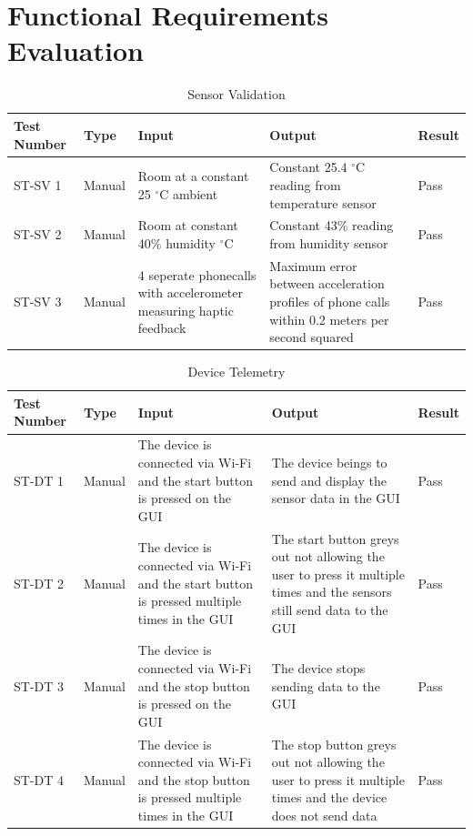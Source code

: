 \documentclass[12pt, titlepage]{article}
\begin{document}
\section{Functional Requirements Evaluation}
\begin{table}[!htbp]
  \begin{tabular}{| p{} | p{}| p{}| p{}| p{}|}
    \hline
    \rowcolor[gray]{0.9}
    Test Number & Type & Input & Output & Result\\
    \hline
    ST-SV 1 & Manual & Room at a constant 25 $^{\circ}$C ambient & Constant 25.4 $^{\circ}$C reading from temperature sensor & Pass \\
    \hline
    ST-SV 2 & Manual & Room at constant 40\% humidity $^{\circ}$C & Constant 43\% reading from humidity sensor & Pass \\
    \hline
    ST-SV 3 & Manual & 4 seperate phonecalls with accelerometer measuring haptic feedback & Maximum error between acceleration profiles of phone calls within 0.2 meters per second squared & Pass  \\
    \hline
  \end{tabular}
  \caption{Sensor Validation}
  \end{table}

\begin{table}[!htbp]
  \begin{tabular}{| p{} | p{}| p{}| p{}| p{}|}
    \hline
    \rowcolor[gray]{0.9}
    Test Number & Type & Input & Output & Result\\
    \hline
    ST-DT 1 & Manual & The device is connected via Wi-Fi and the start button is pressed on the GUI & The device beings to send and display the sensor data in the GUI & Pass \\
    \hline
    ST-DT 2 & Manual & The device is connected via Wi-Fi and the start button is pressed multiple times in the GUI & The start button greys out not allowing the user to press it multiple times and the sensors still send data to the GUI & Pass \\
    \hline
    ST-DT 3 & Manual & The device is connected via Wi-Fi and the stop button is pressed on the GUI & The device stops sending data to the GUI & Pass  \\
    \hline
    ST-DT 4 & Manual & The device is connected via Wi-Fi and the stop button is pressed multiple times in the GUI & The stop button greys out not allowing the user to press it multiple times and the device does not send data & Pass  \\
    \hline
  \end{tabular}
  \caption{Device Telemetry}
  \end{table}
\end{document}
